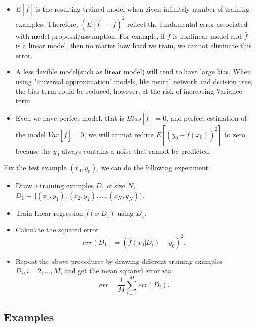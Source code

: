 \begin{refsection}
\begin{remark}\hfill
	\begin{itemize}
		\item $E[\hat{f}]$ is the resulting trained model when given infinitely number of training examples. Therefore, $(E[\hat{f}] - f)^2$ reflect the fundamental error associated with model proposal/assumption. For example, if $f$ is nonlinear model and $\hat{f}$ is a linear model, then no matter how hard we train, we cannot eliminate this error. 
		\item A less flexible model(such as linear model) will tend to have large bias. When using "universal approximation" models, like neural network and decision tree, the bias term could be reduced, however, at the risk of increasing Variance term.
	\end{itemize}
\end{remark}


\begin{remark}\hfill
	\begin{itemize}
		\item Even we have perfect model, that is $Bias[\hat{f}] = 0$, and perfect estimation of the model $Var[\hat{f}]=0$, we will cannot reduce 
		$E[(y_0 - \hat{f}(x_0))^2]$ to zero because the $y_0$ always contains a noise that cannot be predicted.
	\end{itemize}
\end{remark}

\begin{method}
Fix the test example $(x_0,y_0)$, we can do the following experiment:
\begin{itemize}
	\item Draw a training examples $D_1$ of size $N$, $D_1=\{(x_1,y_1),(x_2,y_2),...,(x_N, y_N)\}$.
	\item Train linear regression $\hat{f}(x|D_1)$ using $D_1$.
	\item Calculate the squared error
	$$err(D_1) = (\hat{f}(x_0|D_i) - y_0)^2.$$
	\item Repeat the above procedures by drawing different training examples $D_i,i=2,...,M$, and get the mean squared error via
	$$err = \frac{1}{M}\sum_{i=1}^M err(D_i).$$ 
\end{itemize}	
\end{method}

\subsection{Examples}


\end{refsection}
